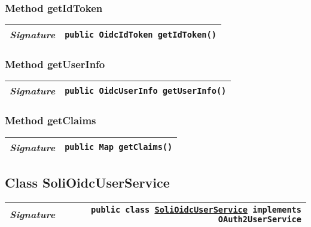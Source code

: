 \begin{adjustwidth}{1.5em}{0pt}
\begin{adjustwidth}{1.5em}{0pt}
\begin{adjustwidth}{1.5em}{0pt}
{\begin{tabularx}{1.0\linewidth}{@{}l R@{}}
      \end{tabularx}}
    \end{adjustwidth}\subsubsection{Method getIdToken\label{edu.kit.hci.soli.config.security.SoliOidcUserDetails@getIdToken()}}
    \begin{adjustwidth}{1.5em}{0pt}
      {\begin{tabularx}{1.0\linewidth}{@{}l R@{}}
        \emph{Signature} & \texttt{public \texttt{OidcIdToken} getIdToken()} \\
        \hline
  
      \end{tabularx}}
    \end{adjustwidth}\subsubsection{Method getUserInfo\label{edu.kit.hci.soli.config.security.SoliOidcUserDetails@getUserInfo()}}
    \begin{adjustwidth}{1.5em}{0pt}
      {\begin{tabularx}{1.0\linewidth}{@{}l R@{}}
        \emph{Signature} & \texttt{public \texttt{OidcUserInfo} getUserInfo()} \\
        \hline
  
      \end{tabularx}}
    \end{adjustwidth}\subsubsection{Method getClaims\label{edu.kit.hci.soli.config.security.SoliOidcUserDetails@getClaims()}}
    \begin{adjustwidth}{1.5em}{0pt}
      {\begin{tabularx}{1.0\linewidth}{@{}l R@{}}
        \emph{Signature} & \texttt{public \texttt{Map} getClaims()} \\
        \hline
  
      \end{tabularx}}
    \end{adjustwidth}
  \end{adjustwidth}\subsection{Class SoliOidcUserService\label{edu.kit.hci.soli.config.security.SoliOidcUserService} }
  \begin{adjustwidth}{1.5em}{0pt}
    {\begin{tabularx}{1.0\linewidth}{@{}l R@{}}
      \emph{Signature} & \texttt{public  class \texttt{\hyperref[edu.kit.hci.soli.config.security.SoliOidcUserService]{\texttt{SoliOidcUserService}} implements \texttt{OAuth2UserService}}} \\
      \hline
  

\end{tabularx}}
\end{adjustwidth}
\end{adjustwidth}
